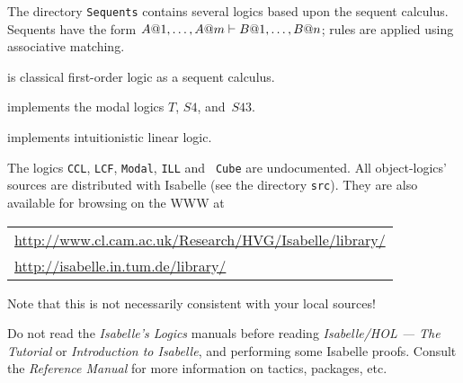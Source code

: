 The directory \texttt{Sequents} contains several logics based
  upon the sequent calculus.  Sequents have the form $A@1,\ldots,A@m\vdash
B@1,\ldots,B@n$; rules are applied using associative matching.
\begin{ttdescription}
\item[\thydx{LK}] is classical first-order logic as a sequent calculus.

\item[\thydx{Modal}] implements the modal logics $T$, $S4$, and~$S43$.  

\item[\thydx{ILL}] implements intuitionistic linear logic.
\end{ttdescription}

The logics \texttt{CCL}, \texttt{LCF}, \texttt{Modal}, \texttt{ILL} and {\tt
  Cube} are undocumented.  All object-logics' sources are distributed with
Isabelle (see the directory \texttt{src}).  They are also available for
browsing on the WWW at

\begin{center}\small
  \begin{tabular}{l}
    \url{http://www.cl.cam.ac.uk/Research/HVG/Isabelle/library/} \\
    \url{http://isabelle.in.tum.de/library/} \\
  \end{tabular}
\end{center}

Note that this is not necessarily consistent with your local sources!

\medskip Do not read the \emph{Isabelle's Logics} manuals before reading
\emph{Isabelle/HOL --- The Tutorial} or \emph{Introduction to Isabelle}, and
performing some Isabelle proofs.  Consult the {\em Reference Manual} for more
information on tactics, packages, etc.


